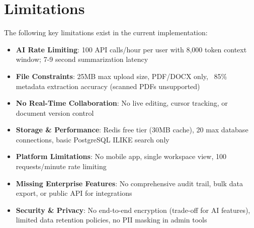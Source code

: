 \chapter{Limitations}
\label{ch:limitations}

The following key limitations exist in the current implementation:

\begin{itemize}
    \item \textbf{AI Rate Limiting}: 100 API calls/hour per user with 8,000 token context window; 7-9 second summarization latency
    
    \item \textbf{File Constraints}: 25MB max upload size, PDF/DOCX only, ~85\% metadata extraction accuracy (scanned PDFs unsupported)
    
    \item \textbf{No Real-Time Collaboration}: No live editing, cursor tracking, or document version control
    
    \item \textbf{Storage \& Performance}: Redis free tier (30MB cache), 20 max database connections, basic PostgreSQL ILIKE search only
    
    \item \textbf{Platform Limitations}: No mobile app, single workspace view, 100 requests/minute rate limiting
    
    \item \textbf{Missing Enterprise Features}: No comprehensive audit trail, bulk data export, or public API for integrations
    
    \item \textbf{Security \& Privacy}: No end-to-end encryption (trade-off for AI features), limited data retention policies, no PII masking in admin tools
\end{itemize}

